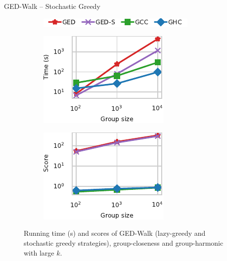 \documentclass[10pt,titlepage,english,presentation]{beamer}
\begin{document}
\begin{frame}[t]{GED-Walk -- Stochastic Greedy}
\begin{figure}
\begin{subfigure}[t]{\textwidth}
\centering
\includegraphics[width=.5\textwidth]{../sources/plots/ged-walk/legend-ged-time-vs-group-large.pdf}
\end{subfigure}\medskip

\begin{subfigure}[t]{.5\textwidth}
\centering
\includegraphics[width=.75\textwidth]{../sources/plots/ged-walk/ged-time-vs-group-large.pdf}
\end{subfigure}\hfill
\begin{subfigure}[t]{.5\textwidth}
\centering
\includegraphics[width=.75\textwidth]{../sources/plots/ged-walk/ged-score-vs-group-large.pdf}
\end{subfigure}

\caption*{\footnotesize Running time (s) and scores of GED-Walk (lazy-greedy and stochastic greedy
strategies), group-closeness and group-harmonic with large $k$.}
\end{figure}
\end{frame}
\end{document}
